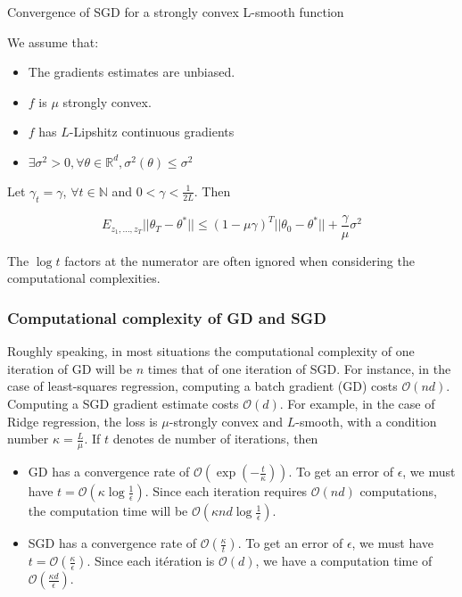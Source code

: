 \documentclass[
10pt, %
a4paper, %
oneside, %
headinclude,footinclude, %
BCOR5mm, %
]{scrartcl}
\begin{document}
\begin{theorem}{Convergence of SGD for a strongly convex L-smooth function}
    
    We assume that:
    \begin{itemize}
	\item The gradients estimates are unbiased.
        \item $f$ is $\mu$ strongly convex.
	\item $f$ has $L$-Lipshitz continuous gradients
	\item $\exists \sigma^2>0, \forall \theta \in \mathbb{R}^d, \sigma^2(\theta)\leq \sigma^2$
    \end{itemize}
    Let $\gamma_t = \gamma$, $\forall t\in \mathbb{N} $ and $ 0<\gamma < \frac{1}{2L} $. Then

    \begin{equation*}
	E_{z_1, \dots, z_T}||\theta_T-\theta^*||\leq (1-\mu\gamma)^T||\theta_0-\theta^*|| + \frac{ \gamma}{\mu} \sigma^2
    \end{equation*}
\end{theorem}

\begin{remark}
    The $\log t$ factors at the numerator are often ignored when considering the computational complexities.
\end{remark}

\subsubsection{\large\color{Periwinkle}Computational complexity of GD and SGD}

Roughly speaking, in most situations the computational complexity of one
iteration of GD will be $n$ times that of one iteration of SGD. For instance, in the case of least-squares regression, computing a batch gradient (GD) costs $ \mathcal{O} (nd)$. Computing a SGD gradient estimate costs $ \mathcal{O} (d)$. For example, in the case of Ridge regression, the loss is $\mu$-strongly convex and $L$-smooth, with a condition number $\kappa = \frac{L}{\mu} $. If $t$ denotes de number of iterations, then
\begin{itemize}
    \item GD has a convergence rate of $\mathcal{O} (\exp( - \frac{t}{\kappa} ))$. To get an error of $\epsilon$, we must have $ t= \mathcal{O} ( \kappa \log \frac{1}{\epsilon} )$. Since each iteration requires $ \mathcal{O} (nd)$ computations, the computation time will be $ \mathcal{O} (\kappa nd\log\frac{1}{\epsilon}) $.
    \item SGD has a convergence rate of $ \mathcal{O} ( \frac{\kappa}{t} )$. To get an error of $\epsilon$, we must have $ t = \mathcal{O}( \frac{\kappa}{\epsilon} ) $. Since each itération is $ \mathcal{O} (d)$, we have a computation time of $ \mathcal{O} ( \frac{\kappa d}{\epsilon} )$.

\end{itemize}
\end{document}
